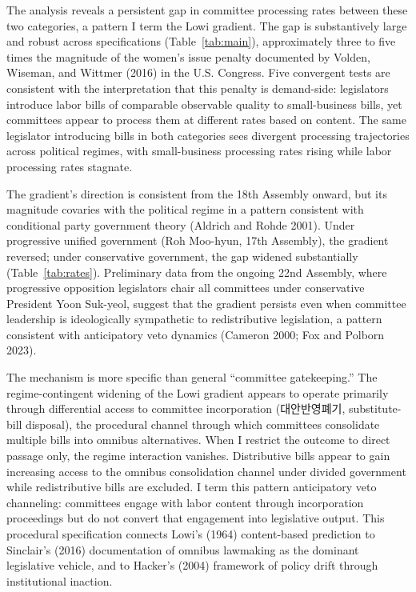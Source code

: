 \documentclass[11pt]{article}
\begin{document}
The analysis reveals a persistent gap in committee processing rates between these two categories, a pattern I term the Lowi gradient. The gap is substantively large and robust across specifications (Table~\ref{tab:main}), approximately three to five times the magnitude of the women's issue penalty documented by Volden, Wiseman, and Wittmer (2016) in the U.S. Congress. Five convergent tests are consistent with the interpretation that this penalty is demand-side: legislators introduce labor bills of comparable observable quality to small-business bills, yet committees appear to process them at different rates based on content. The same legislator introducing bills in both categories sees divergent processing trajectories across political regimes, with small-business processing rates rising while labor processing rates stagnate.

The gradient's direction is consistent from the 18th Assembly onward, but its magnitude covaries with the political regime in a pattern consistent with conditional party government theory (Aldrich and Rohde 2001). Under progressive unified government (Roh Moo-hyun, 17th Assembly), the gradient reversed; under conservative government, the gap widened substantially (Table~\ref{tab:rates}). Preliminary data from the ongoing 22nd Assembly, where progressive opposition legislators chair all committees under conservative President Yoon Suk-yeol, suggest that the gradient persists even when committee leadership is ideologically sympathetic to redistributive legislation, a pattern consistent with anticipatory veto dynamics (Cameron 2000; Fox and Polborn 2023).

The mechanism is more specific than general ``committee gatekeeping.'' The regime-contingent widening of the Lowi gradient appears to operate primarily through differential access to committee incorporation (대안반영폐기, substitute-bill disposal), the procedural channel through which committees consolidate multiple bills into omnibus alternatives. When I restrict the outcome to direct passage only, the regime interaction vanishes. Distributive bills appear to gain increasing access to the omnibus consolidation channel under divided government while redistributive bills are excluded. I term this pattern anticipatory veto channeling: committees engage with labor content through incorporation proceedings but do not convert that engagement into legislative output. This procedural specification connects Lowi's (1964) content-based prediction to Sinclair's (2016) documentation of omnibus lawmaking as the dominant legislative vehicle, and to Hacker's (2004) framework of policy drift through institutional inaction.
\end{document}
